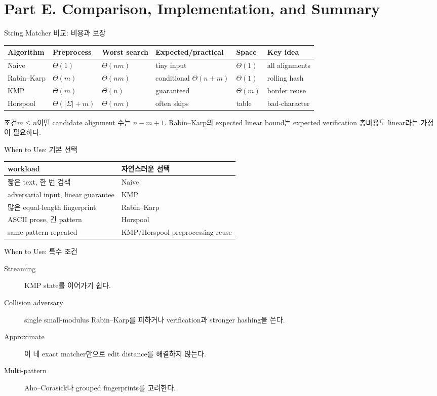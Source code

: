 \section{Part E. Comparison, Implementation, and Summary}
\begin{frame}{String Matcher 비교: 비용과 보장}
\scriptsize\centering\setlength{\tabcolsep}{3pt}\begin{tabular}{llllll}\toprule
Algorithm&Preprocess&Worst search&Expected/practical&Space&Key idea\\\midrule
Naive&\(\Theta(1)\)&\(\Theta(nm)\)&tiny input&\(\Theta(1)\)&all alignments\\
Rabin--Karp&\(\Theta(m)\)&\(\Theta(nm)\)&conditional \(\Theta(n+m)\)&\(\Theta(1)\)&rolling hash\\
KMP&\(\Theta(m)\)&\(\Theta(n)\)&guaranteed&\(\Theta(m)\)&border reuse\\
Horspool&\(\Theta(|\Sigma|+m)\)&\(\Theta(nm)\)&often skips&table&bad-character\\\bottomrule
\end{tabular}
\begin{block}{조건}\(m\le n\)이면 candidate alignment 수는 \(n-m+1\). Rabin--Karp의 expected linear bound는 expected verification 총비용도 linear라는 가정이 필요하다.\end{block}
\end{frame}
\begin{frame}{When to Use: 기본 선택}
\small\begin{tabular}{ll}\toprule
workload&자연스러운 선택\\\midrule
짧은 text, 한 번 검색&Naive\\
adversarial input, linear guarantee&KMP\\
많은 equal-length fingerprint&Rabin--Karp\\
ASCII prose, 긴 pattern&Horspool\\
same pattern repeated&KMP/Horspool preprocessing reuse\\\bottomrule
\end{tabular}
\end{frame}
\begin{frame}{When to Use: 특수 조건}
\begin{description}
\item[Streaming]KMP state를 이어가기 쉽다.
\item[Collision adversary]single small-modulus Rabin--Karp를 피하거나 verification과 stronger hashing을 쓴다.
\item[Approximate]이 네 exact matcher만으로 edit distance를 해결하지 않는다.
\item[Multi-pattern]Aho--Corasick나 grouped fingerprints를 고려한다.
\end{description}
\end{frame}
